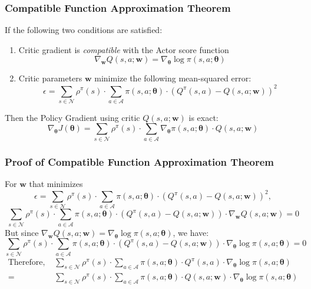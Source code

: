 \documentclass[handout]{beamer}
\begin{document}
\begin{frame}
\frametitle{Compatible Function Approximation Theorem}
\pause
\begin{theorem}
If the following two conditions are satisfied:
\pause
\begin{enumerate}
\item Critic gradient is {\em compatible} with the Actor score function
$$\nabla_{\bm{w}} Q(s,a;\bm{w}) = \nabla_{\bm{\theta}} \log \pi(s,a; \bm{\theta})$$ 
\pause
\item Critic parameters $\bm{w}$ minimize the following mean-squared error:
$$\epsilon = \sum_{s \in \mathcal{N}} \rho^{\pi}(s) \cdot \sum_{a \in \mathcal{A}} \pi(s,a; \bm{\theta}) \cdot (Q^{\pi}(s,a) - Q(s,a;\bm{w}))^2$$
\end{enumerate}
\pause
Then the Policy Gradient using critic $Q(s,a;\bm{w})$ is exact:
$$\nabla_{\bm{\theta}} J(\bm{\theta}) = \sum_{s \in \mathcal{N}} \rho^{\pi}(s) \cdot \sum_{a \in \mathcal{A}} \nabla_{\bm{\theta}} \pi(s, a; \bm{\theta}) \cdot Q(s,a; \bm{w})$$
\end{theorem}
\end{frame}

\begin{frame}
\frametitle{Proof of Compatible Function Approximation Theorem}
\pause
For $\bm{w}$ that minimizes
$$\epsilon = \sum_{s \in \mathcal{N}} \rho^{\pi}(s) \cdot \sum_{a \in \mathcal{A}} \pi(s,a; \bm{\theta}) \cdot (Q^{\pi}(s,a) - Q(s,a;\bm{w}))^2,$$
\pause
$$\sum_{s \in \mathcal{N}} \rho^{\pi}(s) \cdot \sum_{a \in \mathcal{A}} \pi(s,a; \bm{\theta}) \cdot (Q^{\pi}(s,a) - Q(s,a;\bm{w})) \cdot \nabla_{\bm{w}} Q(s,a;\bm{w}) = 0$$
\pause
But since $\nabla_{\bm{w}} Q(s,a;\bm{w}) = \nabla_{\bm{\theta}} \log \pi(s,a; \bm{\theta})$, we have:
\pause
$$\sum_{s \in \mathcal{N}} \rho^{\pi}(s) \cdot \sum_{a \in \mathcal{A}} \pi(s,a; \bm{\theta}) \cdot (Q^{\pi}(s,a) - Q(s,a;\bm{w})) \cdot \nabla_{\bm{\theta}} \log \pi(s,a; \bm{\theta}) = 0$$
\pause
\begin{align*}
\mbox{Therefore, } & \sum_{s \in \mathcal{N}} \rho^{\pi}(s) \cdot \sum_{a \in \mathcal{A}} \pi(s,a; \bm{\theta}) \cdot Q^{\pi}(s,a) \cdot \nabla_{\bm{\theta}} \log \pi(s,a; \bm{\theta}) \\
= & \sum_{s \in \mathcal{N}} \rho^{\pi}(s) \cdot \sum_{a \in \mathcal{A}} \pi(s,a; \bm{\theta}) \cdot Q(s,a; \bm{w}) \cdot \nabla_{\bm{\theta}} \log \pi(s,a; \bm{\theta})\\
\end{align*}
\end{frame}
\end{document}
